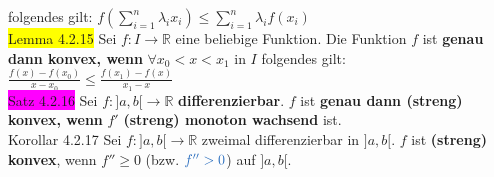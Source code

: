 \documentclass[landscape, 10pt]{article}
\newcommand{\R}{\mathbb{R}}
\begin{document}
\begin{multicols}{3}
                     folgendes gilt: \textcolor{NavyBlue}{
                     $f(\sum_{i=1}^n\lambda_i x_i)
                     \leqslant\sum_{i=1}^n\lambda_if(x_i)$}\\
              \colorbox{yellow}{Lemma 4.2.15} 
                     Sei \textcolor{NavyBlue}{$f:I\longrightarrow\R$} 
                     eine beliebige Funktion. Die Funktion \textcolor{NavyBlue}{$f$}
                     ist \textbf{genau dann konvex, wenn} 
                     \textcolor{NavyBlue}{$\forall x_0<x<x_1$} in 
                     \textcolor{NavyBlue}{$I$}
                     folgendes gilt: \textcolor{NavyBlue}{
                     $\frac{f(x)-f(x_0)}{x-x_0}\leqslant\frac{f(x_1)-f(x)}{x_1-x}$}\\ 
              \colorbox{magenta}{Satz 4.2.16} 
                     Sei \textcolor{NavyBlue}{$f:]a,b[\longrightarrow\R$}
                     \textbf{differenzierbar}. 
                     \textcolor{NavyBlue}{$f$} ist 
                     \textbf{genau dann (streng) konvex, wenn} 
                     \textcolor{NavyBlue}{$f'$} \textbf{(streng) monoton
                     wachsend} ist.\\
              \colorbox{BurntOrange}{Korollar 4.2.17} 
                     Sei \textcolor{NavyBlue}{$f:]a,b[\longrightarrow\R$}
                     zweimal differenzierbar in \textcolor{NavyBlue}{$]a,b[$}. 
                     \textcolor{NavyBlue}{$f$} ist \textbf{(streng) konvex}, 
                     wenn \textcolor{NavyBlue}{$f''\geqslant0$} (bzw. 
                     $\textcolor{NavyBlue}{f''>0}$) auf 
                     \textcolor{NavyBlue}{$]a,b[$}.

\end{multicols}
\end{document}
